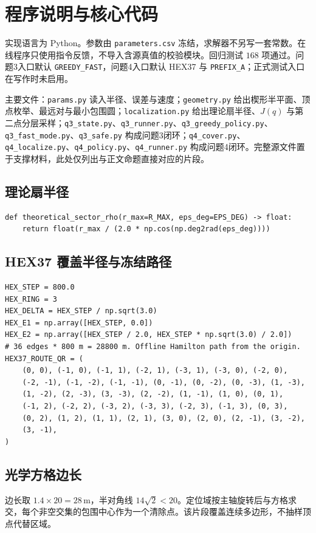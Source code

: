 \section{程序说明与核心代码}

实现语言为 Python。参数由 \texttt{parameters.csv} 冻结，求解器不另写一套常数。在线程序只使用指令反馈，不导入含源真值的校验模块。回归测试 $168$ 项通过。问题3入口默认 \texttt{GREEDY\_FAST}，问题4入口默认 HEX37 与 \texttt{PREFIX\_A}；正式测试入口在写作时未启用。

主要文件：\texttt{params.py} 读入半径、误差与速度；\texttt{geometry.py} 给出楔形半平面、顶点枚举、最远对与最小包围圆；\texttt{localization.py} 给出理论扇半径、$J(q)$ 与第二点分层采样；\texttt{q3\_state.py}、\texttt{q3\_runner.py}、\texttt{q3\_greedy\_policy.py}、\texttt{q3\_fast\_mode.py}、\texttt{q3\_safe.py} 构成问题3闭环；\texttt{q4\_cover.py}、\texttt{q4\_localize.py}、\texttt{q4\_policy.py}、\texttt{q4\_runner.py} 构成问题4闭环。完整源文件置于支撑材料，此处仅列出与正文命题直接对应的片段。

\subsection{理论扇半径}

\begin{lstlisting}
def theoretical_sector_rho(r_max=R_MAX, eps_deg=EPS_DEG) -> float:
    return float(r_max / (2.0 * np.cos(np.deg2rad(eps_deg))))
\end{lstlisting}

\subsection{HEX37 覆盖半径与冻结路径}

\begin{lstlisting}
HEX_STEP = 800.0
HEX_RING = 3
HEX_DELTA = HEX_STEP / np.sqrt(3.0)
HEX_E1 = np.array([HEX_STEP, 0.0])
HEX_E2 = np.array([HEX_STEP / 2.0, HEX_STEP * np.sqrt(3.0) / 2.0])
# 36 edges * 800 m = 28800 m. Offline Hamilton path from the origin.
HEX37_ROUTE_QR = (
    (0, 0), (-1, 0), (-1, 1), (-2, 1), (-3, 1), (-3, 0), (-2, 0),
    (-2, -1), (-1, -2), (-1, -1), (0, -1), (0, -2), (0, -3), (1, -3),
    (1, -2), (2, -3), (3, -3), (2, -2), (1, -1), (1, 0), (0, 1),
    (-1, 2), (-2, 2), (-3, 2), (-3, 3), (-2, 3), (-1, 3), (0, 3),
    (0, 2), (1, 2), (1, 1), (2, 1), (3, 0), (2, 0), (2, -1), (3, -2),
    (3, -1),
)
\end{lstlisting}

\subsection{光学方格边长}

边长取 $1.4\times 20=28\,\mathrm{m}$，半对角线 $14\sqrt{2}<20$。定位域按主轴旋转后与方格求交，每个非空交集的包围中心作为一个清除点。该片段覆盖连续多边形，不抽样顶点代替区域。
